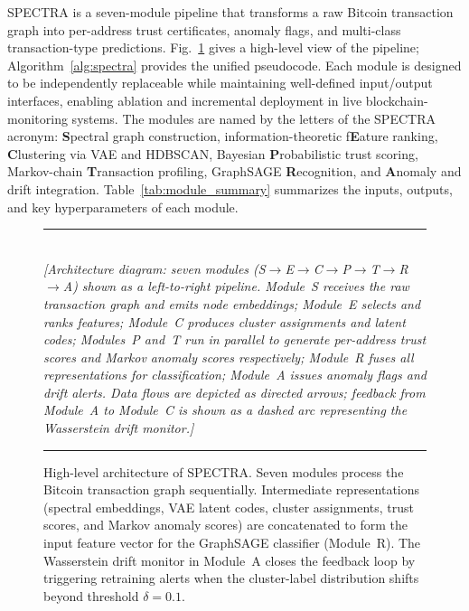 \documentclass[journal]{IEEEtran}
\begin{document}
\textsc{SPECTRA} is a seven-module pipeline that transforms a raw Bitcoin
transaction graph into per-address trust certificates, anomaly flags, and
multi-class transaction-type predictions.
Fig.~\ref{fig:architecture} gives a high-level view of the pipeline;
Algorithm~\ref{alg:spectra} provides the unified pseudocode.
Each module is designed to be independently replaceable while maintaining
well-defined input/output interfaces, enabling ablation and incremental
deployment in live blockchain-monitoring systems.
The modules are named by the letters of the \textsc{SPECTRA} acronym:
\textbf{S}pectral graph construction,
information-theoretic f\textbf{E}ature ranking,
\textbf{C}lustering via VAE and HDBSCAN,
Bayesian \textbf{P}robabilistic trust scoring,
Markov-chain \textbf{T}ransaction profiling,
GraphSAGE \textbf{R}ecognition, and
\textbf{A}nomaly and drift integration.
Table~\ref{tab:module_summary} summarizes the inputs, outputs, and key
hyperparameters of each module.

\begin{figure}[t]
  \centering
  \rule{\columnwidth}{0.4pt}\\[2ex]
  \textit{[Architecture diagram: seven modules (S$\to$E$\to$C$\to$P$\to$T$\to$R$\to$A)
  shown as a left-to-right pipeline. Module~S receives the raw transaction
  graph and emits node embeddings; Module~E selects and ranks features;
  Module~C produces cluster assignments and latent codes; Modules~P and~T
  run in parallel to generate per-address trust scores and Markov anomaly
  scores respectively; Module~R fuses all representations for classification;
  Module~A issues anomaly flags and drift alerts. Data flows are depicted as
  directed arrows; feedback from Module~A to Module~C is shown as a dashed
  arc representing the Wasserstein drift monitor.]}\\[2ex]
  \rule{\columnwidth}{0.4pt}
  \caption{High-level architecture of \textsc{SPECTRA}.
    Seven modules process the Bitcoin transaction graph sequentially.
    Intermediate representations (spectral embeddings, VAE latent codes,
    cluster assignments, trust scores, and Markov anomaly scores) are
    concatenated to form the input feature vector for the GraphSAGE
    classifier (Module~R).
    The Wasserstein drift monitor in Module~A closes the feedback loop
    by triggering retraining alerts when the cluster-label distribution
    shifts beyond threshold $\delta=0.1$.}
  \label{fig:architecture}
\end{figure}
\end{document}
